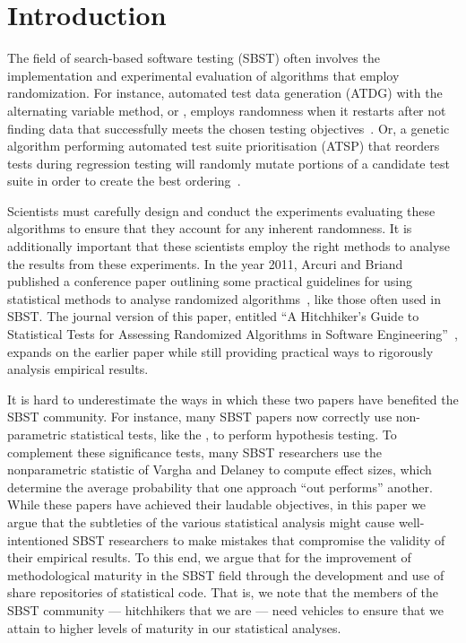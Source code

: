 
\section{Introduction}
\label{sec:introduction}

The field of search-based software testing (SBST) often involves the implementation and experimental evaluation of
algorithms that employ randomization. For instance, automated test data generation (ATDG) with the alternating variable
method, or \AVM, employs randomness when it restarts after not finding data that successfully meets the chosen
testing objectives~\cite{McMinn2015}. Or, a genetic algorithm performing automated test suite prioritisation (ATSP) that
reorders tests during regression testing will randomly mutate portions of a candidate test suite in order to
create the best ordering~\cite{Walcott2006}.

Scientists must carefully design and conduct the experiments evaluating these algorithms to ensure that they account for
any inherent randomness. It is additionally important that these scientists employ the right methods to analyse the results
from these experiments. In the year 2011, Arcuri and Briand published a conference paper outlining some practical
guidelines for using statistical methods to analyse randomized algorithms~\cite{Arcuri2011}, like those often used in
SBST. The journal version of this paper, entitled ``A Hitchhiker's Guide to Statistical Tests for
Assessing Randomized Algorithms in Software Engineering''~\cite{Arcuri2014}, expands on the earlier paper while still
providing practical ways to rigorously analysis empirical results.

It is hard to underestimate the ways in which these two papers have benefited the SBST community. For instance, many
SBST papers now correctly use non-parametric statistical tests, like the \wilcoxon, to perform hypothesis testing. To
complement these significance tests, many SBST researchers use the nonparametric \atwelve statistic of Vargha and
Delaney \cite{Vargha2000} to compute effect sizes, which determine the average probability that one approach ``out
performs'' another. While these papers have achieved their laudable objectives, in this paper we argue that the
subtleties of the various statistical analysis might cause well-intentioned SBST researchers to make mistakes that
compromise the validity of their empirical results. To this end, we argue that for the improvement of methodological
maturity in the SBST field through the development and use of share repositories of statistical code. That is, we note
that the members of the SBST community --- hitchhikers that we are --- need vehicles to ensure that we attain to higher
levels of maturity in our statistical analyses.

